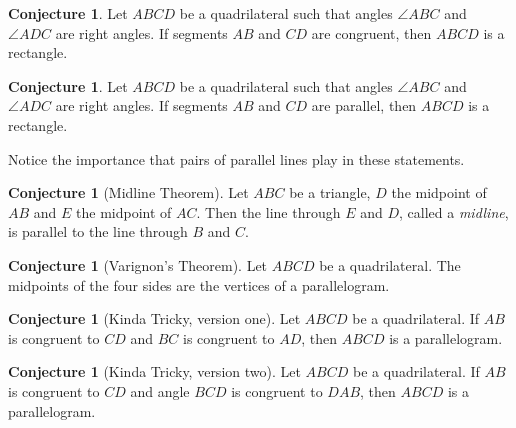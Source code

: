 \documentclass{tufte-handout}
\theoremstyle{definition}
\newtheorem{conjecture}[problem]{Conjecture}
\begin{document}
\begin{conjecture}\label{conj:opp-congruent-implies-rectangle}
Let $ABCD$ be a quadrilateral such that angles $\angle ABC$ and $\angle ADC$ are right angles.
If segments $AB$ and $CD$ are congruent, then $ABCD$ is a rectangle.
\end{conjecture}

\begin{conjecture}\label{conj:opp-parallel-implies-rectangle}
Let $ABCD$ be a quadrilateral such that angles $\angle ABC$ and $\angle ADC$ are right angles.
If segments $AB$ and $CD$ are parallel, then $ABCD$ is a rectangle.
\end{conjecture}

Notice the importance that pairs of parallel lines play in these statements.

\clearpage


\begin{conjecture}[Midline Theorem] \label{conj:midline-theorem}
Let $ABC$ be a triangle, $D$ the midpoint of $AB$ and $E$ the midpoint of $AC$.
Then the line through $E$ and $D$, called a \emph{midline}, is parallel to the line through $B$ and $C$.
\end{conjecture}

\begin{conjecture}[Varignon's Theorem]\label{conj:Varignon}
Let $ABCD$ be a quadrilateral. The midpoints of the four sides are the vertices of a parallelogram.
\end{conjecture}

\begin{conjecture}[Kinda Tricky, version one] \label{conj:experiment-1}
Let $ABCD$ be a quadrilateral. If $AB$ is congruent to $CD$ and $BC$ is congruent to $AD$, then $ABCD$ is a parallelogram.
\end{conjecture}

\begin{conjecture}[Kinda Tricky, version two] \label{conj:experiment-2}
Let $ABCD$ be a quadrilateral. If $AB$ is congruent to $CD$ and angle $BCD$ is congruent to $DAB$, then $ABCD$ is a parallelogram.
\end{conjecture}


\vfill
\end{document}
